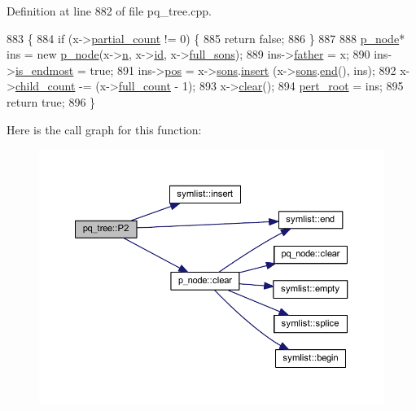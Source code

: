 Definition at line 882 of file pq\+\_\+tree.\+cpp.


\begin{DoxyCode}
883 \{
884     \textcolor{keywordflow}{if} (x->\mbox{\hyperlink{classp__node_a9ac93f9a0f474dcc74312e820fde73b6}{partial\_count}} != 0) \{
885     \textcolor{keywordflow}{return} \textcolor{keyword}{false};
886     \}
887 
888     \mbox{\hyperlink{classp__node}{p\_node}}* ins = \textcolor{keyword}{new} \mbox{\hyperlink{classp__node}{p\_node}}(x->\mbox{\hyperlink{classpq__node_a4997fd09a95d9a659b99cea04197740a}{n}}, x->\mbox{\hyperlink{classpq__node_ad0034c1f93c3c77edb6d3a03f25aba06}{id}}, x->\mbox{\hyperlink{classp__node_a09658fb7a7212e51b877444e4cee4378}{full\_sons}});
889     ins->\mbox{\hyperlink{classpq__node_a3e7c886498c76c633f057fb42ff9c435}{father}} = x;
890     ins->\mbox{\hyperlink{classpq__node_a058dda3d1197dfd2b343d1983d305d79}{is\_endmost}} = \textcolor{keyword}{true};
891     ins->\mbox{\hyperlink{classpq__node_a5e8a5defa0fec4ff2e82fabee97296b4}{pos}} = x->\mbox{\hyperlink{classpq__node_a2cc030cfa4560872acea8b50ebd0542b}{sons}}.\mbox{\hyperlink{classsymlist_a8b3327b8a33b180bf1eb802856f755c3}{insert}} (x->\mbox{\hyperlink{classpq__node_a2cc030cfa4560872acea8b50ebd0542b}{sons}}.\mbox{\hyperlink{classsymlist_a7283589fa01f79d722f8256d7a6a7883}{end}}(), ins);
892     x->\mbox{\hyperlink{classp__node_a74d5be4f6767bda5b5803dc2f0987b74}{child\_count}} -= (x->\mbox{\hyperlink{classp__node_a67a7570ace6b26d3bcbff7cf71c85cb0}{full\_count}} - 1);
893     x->\mbox{\hyperlink{classp__node_af24fe11743b0836b03c108a1bf8a0995}{clear}}();
894     \mbox{\hyperlink{classpq__tree_adf0d16ca5a29bfbe863efb525135ac01}{pert\_root}} = ins;
895     \textcolor{keywordflow}{return} \textcolor{keyword}{true};
896 \}
\end{DoxyCode}
Here is the call graph for this function\+:\nopagebreak
\begin{figure}[H]
\begin{center}
\leavevmode
\includegraphics[width=350pt]{classpq__tree_a38e09d7b7f7627dde9cb20a869e09e96_cgraph}
\end{center}
\end{figure}

